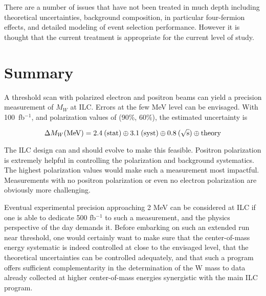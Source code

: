 \documentclass[12pt]{article}
\begin{document}
There are a number of issues that have not been treated in much depth including theoretical uncertainties, background composition, in 
particular four-fermion effects, and detailed modeling of event selection performance. 
However it is thought that the current treatment is appropriate for the current level of study. 

\newpage

\section*{Summary}
A threshold scan with polarized electron and positron beams can yield a precision measurement of $M_W$ at ILC. 
Errors at the few MeV level can be envisaged. With 100~fb$^{-1}$, and polarization values of (90\%, 60\%), 
the estimated uncertainty is 

\[ \Delta M_W (\rm{MeV}) = 2.4 \: \rm{(stat)} \oplus 3.1 \: (syst) \oplus 0.8 \: (\sqrt{s}) \oplus \rm{theory} \] 

The ILC design can and should evolve to make this feasible. Positron polarization is extremely helpful in 
controlling the polarization and background systematics. The highest polarization values would make 
such a measurement most impactful. Measurements with no positron polarization 
or even no electron polarization are obviously more challenging.

Eventual experimental precision approaching 2 MeV can be considered at ILC if one 
is able to dedicate 500 fb$^{-1}$ to such a measurement, and the physics perspective of the day demands it. 
Before embarking on such an extended run near threshold, one would certainly want to make sure that 
the center-of-mass energy systematic is indeed controlled at close to the envisaged level, 
that the theoretical uncertainties can be controlled adequately, and 
that such a program offers sufficient complementarity in the determination of the W mass to 
data already collected at higher center-of-mass energies synergistic with the main ILC program.

\end{document}

